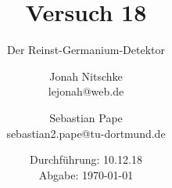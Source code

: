 

\title{Versuch 18}
\subtitle{Der Reinst-Germanium-Detektor}
\author{Jonah Nitschke\\
        lejonah@web.de \and
        Sebastian Pape\\
        sebastian2.pape@tu-dortmund.de}
\date{Durchführung: 10.12.18\\
      Abgabe: \today}



\maketitle
\newpage
\setcounter{page}{1}


\newpage


\printbibliography


